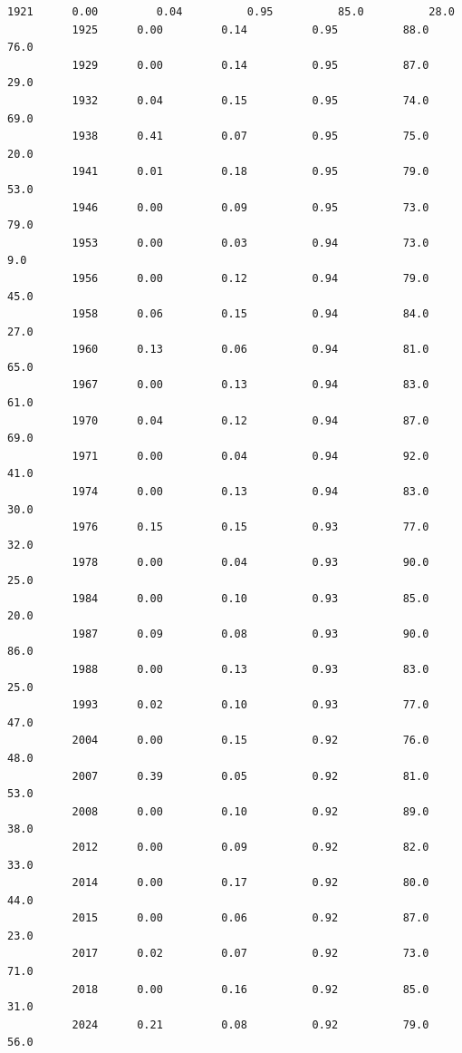 \documentclass[11pt]{article}
\begin{document}
\begin{Verbatim}[commandchars=\\\{\}]
          1921      0.00         0.04          0.95          85.0          28.0   
          1925      0.00         0.14          0.95          88.0          76.0   
          1929      0.00         0.14          0.95          87.0          29.0   
          1932      0.04         0.15          0.95          74.0          69.0   
          1938      0.41         0.07          0.95          75.0          20.0   
          1941      0.01         0.18          0.95          79.0          53.0   
          1946      0.00         0.09          0.95          73.0          79.0   
          1953      0.00         0.03          0.94          73.0           9.0   
          1956      0.00         0.12          0.94          79.0          45.0   
          1958      0.06         0.15          0.94          84.0          27.0   
          1960      0.13         0.06          0.94          81.0          65.0   
          1967      0.00         0.13          0.94          83.0          61.0   
          1970      0.04         0.12          0.94          87.0          69.0   
          1971      0.00         0.04          0.94          92.0          41.0   
          1974      0.00         0.13          0.94          83.0          30.0   
          1976      0.15         0.15          0.93          77.0          32.0   
          1978      0.00         0.04          0.93          90.0          25.0   
          1984      0.00         0.10          0.93          85.0          20.0   
          1987      0.09         0.08          0.93          90.0          86.0   
          1988      0.00         0.13          0.93          83.0          25.0   
          1993      0.02         0.10          0.93          77.0          47.0   
          2004      0.00         0.15          0.92          76.0          48.0   
          2007      0.39         0.05          0.92          81.0          53.0   
          2008      0.00         0.10          0.92          89.0          38.0   
          2012      0.00         0.09          0.92          82.0          33.0   
          2014      0.00         0.17          0.92          80.0          44.0   
          2015      0.00         0.06          0.92          87.0          23.0   
          2017      0.02         0.07          0.92          73.0          71.0   
          2018      0.00         0.16          0.92          85.0          31.0   
          2024      0.21         0.08          0.92          79.0          56.0   
          

\end{Verbatim}
\end{document}
